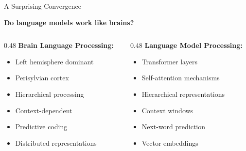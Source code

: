 \documentclass[aspectratio=169]{beamer}
\begin{document}
\begin{frame}{A Surprising Convergence 🧠}
\begin{center}
\LARGE
\textbf{Do language models work like brains?}
\end{center}

\vspace{1em}

\begin{columns}[T]
\begin{column}{0.48\textwidth}
\textbf{Brain Language Processing:}
\begin{itemize}
    \item Left hemisphere dominant
    \item Perisylvian cortex
    \item Hierarchical processing
    \item Context-dependent
    \item Predictive coding
    \item Distributed representations
\end{itemize}

\vspace{0.5em}

\begin{center}
\end{center}
\end{column}

\begin{column}{0.48\textwidth}
\textbf{Language Model Processing:}
\begin{itemize}
    \item Transformer layers
    \item Self-attention mechanisms
    \item Hierarchical representations
    \item Context windows
    \item Next-word prediction
    \item Vector embeddings
\end{itemize}


\end{column}
\end{columns}
\end{frame}
\end{document}
